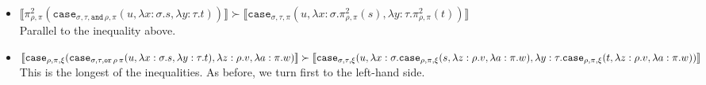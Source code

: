 \documentclass[runningheads,a4paper]{llncs}
\newcommand{\interpret}[1]{\llbracket #1 \rrbracket}
\newcommand{\abs}[2]{\lambda #1.#2}
\begin{document}
\begin{itemize}
\item $\interpret{\pi^2_{\rho,\pi}(\mathtt{case}_{\sigma,\tau,
  \mathtt{and}\,\rho,\pi}(u,\abs{x:\sigma}{s},\abs{y:\tau}{t}))}
  \succ \interpret{\mathtt{case}_{\sigma,\tau,\pi}(u,\abs{x:
  \sigma}{\pi^2_{\rho,\pi}(s)},\abs{y:\tau}{\pi^2_{\rho,\pi}(t)})}$ \\
  Parallel to the inequality above.

\item $\interpret{\mathtt{case}_{\rho,\pi,\xi}(\mathtt{case}_{\sigma,
  \tau,\mathtt{or}\,\rho\,\pi}(u,\abs{x:\sigma}{s},\abs{y:\tau}{t}),
  \abs{z:\rho}{v},\abs{a:\pi}{w})} \succ \\
  \interpret{\mathtt{case}_{\sigma,\tau,\xi}(u,\abs{x:\sigma}{
  \mathtt{case}_{\rho,\pi,\xi}(s,\abs{z:\rho}{v},\abs{a:\pi}{w})},
  \abs{y:\tau}{\mathtt{case}_{\rho,\pi,\xi}(t,\abs{z:\rho}{v},\abs{a:
  \pi}{w})})}$ \\
  This is the longest of the inequalities.  As before, we turn first
  to the left-hand side.


\end{itemize}
\end{document}
